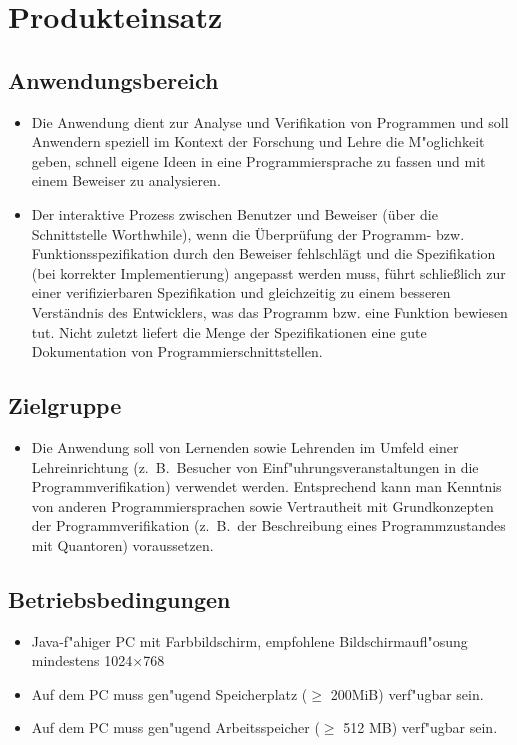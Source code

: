 \section{Produkteinsatz}%

\subsection{Anwendungsbereich}%

\begin{itemize}%
    \item Die Anwendung dient zur Analyse und \see Verifikation von Programmen und soll Anwendern speziell im Kontext der Forschung und Lehre die M"oglichkeit geben, schnell eigene Ideen in eine Programmiersprache zu fassen und mit einem \see Beweiser zu analysieren.%
    \item Der interaktive Prozess zwischen Benutzer und Beweiser (über die Schnittstelle Worthwhile), wenn die Überprüfung der Programm- bzw. Funktionsspezifikation durch den Beweiser fehlschlägt und die Spezifikation (bei korrekter Implementierung) angepasst werden muss, führt schließlich zur einer verifizierbaren Spezifikation und gleichzeitig zu einem besseren Verständnis des Entwicklers, was das Programm bzw. eine Funktion bewiesen tut. Nicht zuletzt liefert die Menge der Spezifikationen eine gute Dokumentation von Programmierschnittstellen.%
\end{itemize}%

\subsection{Zielgruppe}%

\begin{itemize}%
    \item Die Anwendung soll von Lernenden sowie Lehrenden im Umfeld einer Lehreinrichtung (z.~B.\ Besucher von Einf"uhrungsveranstaltungen in die Programmverifikation) verwendet werden. Entsprechend kann man Kenntnis von anderen Programmiersprachen sowie Vertrautheit mit Grundkonzepten der Programmverifikation (z.~B.\ der Beschreibung eines \see Programmzustandes mit \see Quantoren) voraussetzen.%
\end{itemize}%

\subsection{Betriebsbedingungen}%

\begin{itemize}%
    \item \see Java-f"ahiger PC mit Farbbildschirm, empfohlene Bildschirmaufl"osung mindestens 1024$\times$768%
    \item Auf dem PC muss gen"ugend Speicherplatz ($\ge$ 200MiB) verf"ugbar sein.%
    \item Auf dem PC muss gen"ugend Arbeitsspeicher ($\ge$ 512 MB) verf"ugbar sein.%
\end{itemize}%
